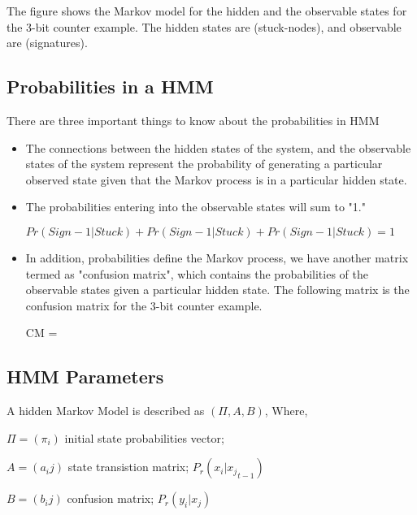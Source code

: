 The figure shows the Markov model for the hidden and the observable states for the 3-bit counter example. The hidden states are (stuck-nodes), and observable are (signatures). 

\subsection{Probabilities in a HMM}

There are three important things to know about the probabilities in HMM

\begin{itemize}
\item The connections between the hidden states of the system, and the observable states of the system represent the probability of generating a particular observed state given that the Markov process is in a particular hidden state.

\item The probabilities entering into the observable states will sum to "1." 

\begin{center}
$Pr(Sign-1|Stuck) + Pr(Sign-1|Stuck) + Pr(Sign-1|Stuck)  = 1 $
\end{center}

\item In addition, probabilities define the Markov process, we have another matrix termed as "confusion matrix", which contains the probabilities of the observable states given a particular hidden state. The following matrix is the confusion matrix for the 3-bit counter example.


\begin{center}


CM = 
\end{center}
\end{itemize}


\subsection{HMM Parameters}

A hidden Markov Model is described as $(\Pi, A, B)$, Where,


\begin{center}

$\Pi = (\pi_i)$ initial state probabilities vector;

$A = (a_ij)$ state transistion matrix;  \hspace{0.3cm} $P_r(x_i | {x_j}_{t-1})$

$B = (b_ij)$ confusion matrix;     \hspace{0.3cm}        $P_r(y_i | x_j)$



\end{center}  


